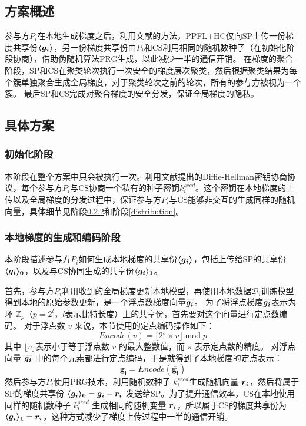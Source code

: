 \subsection{方案概述}
参与方$P_i$在本地生成梯度之后，利用文献\cite{hao2021efficient}的方法，PPFL+HC仅向SP上传一份梯度共享份$\svec{g_i}$，另一份梯度共享份由$P_i$和CS利用相同的随机数种子（在初始化阶段协商），借助伪随机算法PRG生成，以此减少一半的通信开销。
在梯度的聚合阶段，SP和CS在聚类轮次执行一次安全的梯度层次聚类，然后根据聚类结果为每个簇单独聚合生成全局梯度，对于聚类轮次之前的轮次，所有的参与方被视为一个簇。
最后SP和CS完成对聚合梯度的安全分发，保证全局梯度的隐私。

\subsection{具体方案}

\subsubsection{初始化阶段}
本阶段在整个方案中只会被执行一次。利用文献\cite{diffie2022new}提出的Diffie-Hellman密钥协商协议，每个参与方$P_i$与CS协商一个私有的种子密钥$k_i^{seed}$。这个密钥在本地梯度的上传以及全局梯度的分发过程中，保证参与方$P_i$与CS能够非交互的生成同样的随机向量，具体细节见阶段\ref{local}和阶段\ref{distribution}。

\subsubsection{本地梯度的生成和编码阶段}\label{local}
本阶段描述参与方$P_i$如何生成本地梯度的共享份$\svec{g_i}$，包括上传给SP的共享份$\svec[0]{g_i}$，以及与CS协同生成的共享份$\svec[1]{g_i}$。

首先，参与方$P_i$利用收到的全局梯度更新本地模型，再使用本地数据$\mathcal{D}_i$训练模型得到本地的原始参数更新，是一个浮点数梯度向量$\overline{\bs{g_i}}$。
为了将浮点梯度$\overline{\bs{g_i}}$表示为环 $\mathbb{Z}_p$（$p=2^l$，$l$表示比特长度）上的共享份，首先要对这个向量进行定点数编码。
对于浮点数 $v$ 来说，本节使用的定点编码操作如下：
\begin{equation}
	Encode(v) = \lfloor 2^s \times v\rfloor \;\text{mod}\;p
\end{equation}
其中 $\lfloor v\rfloor$表示小于等于浮点数 $v$ 的最大整数值，而 $s$ 表示定点数的精度。
对浮点向量 $\overline{\bs{g_i}}$ 中的每个元素都进行定点编码，于是就得到了本地梯度的定点表示：
\begin{equation}
	\boldsymbol{g_i} = Encode(\overline{\boldsymbol{g_i}})
\end{equation}
然后参与方$P_i$使用PRG技术，利用随机数种子 $k_i^{seed}$生成随机向量 $\bs{r_i}$，然后将属于SP的梯度共享份 $\svec[0]{g_i} = \bs{g_i} - \bs{r_i}$ 发送给SP。为了提升通信效率，CS在本地使用同样的随机数种子 $k_i^{seed}$ 生成相同的随机变量 $\bs{r_i}$，所以属于CS的梯度共享份为 $\svec[1]{g_i} = \bs{r_i}$，这种方式减少了梯度上传过程中一半的通信开销。

